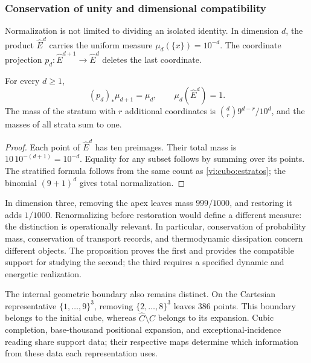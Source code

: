 

\subsubsection{Conservation of unity and dimensional compatibility}

Normalization is not limited to dividing an isolated identity. In dimension
\(d\), the product \(\widehat E^d\) carries the uniform measure
\(\mu_d(\{x\})=10^{-d}\). The coordinate projection
\(p_d:\widehat E^{d+1}\to\widehat E^d\) deletes the last coordinate.

\begin{proposition}
For every \(d\geq1\),
\[
 (p_d)_*\mu_{d+1}=\mu_d,
 \qquad \mu_d(\widehat E^d)=1.
\]
The mass of the stratum with \(r\) additional coordinates is
\(\binom dr9^{d-r}/10^d\), and the masses of all strata sum to one.
\end{proposition}
\begin{proof}
Each point of \(\widehat E^d\) has ten preimages. Their total mass is
\(10\,10^{-(d+1)}=10^{-d}\). Equality for any subset follows by
summing over its points. The stratified formula follows from the same
count as \eqref{vi:cubo:estratos}; the binomial
\((9+1)^d\) gives total normalization.
\end{proof}

In dimension three, removing the apex leaves mass \(999/1000\), and
restoring it adds \(1/1000\). Renormalizing before restoration would
define a different measure: the distinction is operationally relevant.
In particular, conservation of probability mass, conservation of transport
records, and thermodynamic dissipation concern different objects. The
proposition proves the first and provides the compatible support for
studying the second; the third requires a specified dynamic and energetic realization.

The internal geometric boundary also remains distinct.
On the Cartesian representative \(\{1,\ldots,9\}^3\), removing
\(\{2,\ldots,8\}^3\) leaves \(386\) points. This boundary belongs
to the initial cube, whereas \(\widehat C\setminus C\) belongs to
its expansion. Cubic completion, base-thousand positional expansion,
and exceptional-incidence reading share support data; their respective
maps determine which information from these data each representation uses.
